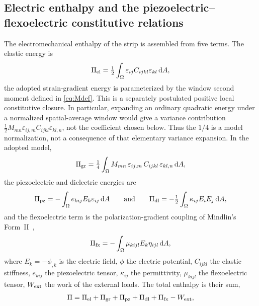 \FloatBarrier
\subsection{Electric enthalpy and the piezoelectric--flexoelectric
constitutive relations}
\label{sec:energy}

The electromechanical enthalpy of the strip is assembled from five terms. The
elastic energy is
\begin{equation}
  \Pi_{\rm el} = \tfrac12\int_\Omega \varepsilon_{ij} C_{ijkl}
        \varepsilon_{kl}\,\mathrm{d}A ,
  \label{eq:Eel}
\end{equation}
the adopted strain-gradient energy is parameterized by the window second
moment defined in \eqref{eq:Mdef}. This is a separately postulated positive
local constitutive closure. In particular, expanding an ordinary quadratic
energy under a normalized spatial-average window would give a variance
contribution $\tfrac12 M_{mn}\varepsilon_{ij,m}C_{ijkl}\varepsilon_{kl,n}$,
not the coefficient chosen below. Thus the $1/4$ is a model normalization,
not a consequence of that elementary variance expansion. In the adopted model,
\begin{equation}
  \Pi_{\rm gr} = \tfrac14\int_\Omega M_{mn}\,
        \varepsilon_{ij,m}\,C_{ijkl}\,\varepsilon_{kl,n}\,\mathrm{d}A ,
  \label{eq:Egrad}
\end{equation}
the piezoelectric and dielectric energies are
\begin{equation}
  \Pi_{\rm pz} = -\int_\Omega e_{kij} E_k \varepsilon_{ij}\,\mathrm{d}A
  \qquad\text{and}\qquad
  \Pi_{\rm dl} = -\tfrac12\int_\Omega \kappa_{ij} E_i E_j\,\mathrm{d}A ,
  \label{eq:Epiezo}
\end{equation}
and the flexoelectric term is the polarization-gradient coupling of Mindlin's
Form~II~\cite{Mindlin1965,Toupin1962,Mindlin1968},
\begin{equation}
  \Pi_{\rm fx} = -\int_\Omega \mu_{kijl} E_k \eta_{ijl}\,\mathrm{d}A ,
  \label{eq:Eflexo}
\end{equation}
where $E_k=-\phi_{,k}$ is the electric field, $\phi$ the electric potential,
$C_{ijkl}$ the elastic stiffness, $e_{kij}$ the piezoelectric tensor,
$\kappa_{ij}$ the permittivity, $\mu_{kijl}$ the flexoelectric tensor,
$W_{\rm ext}$ the work of the external loads. The total enthalpy is their sum,
\begin{equation}
  \Pi = \Pi_{\rm el} + \Pi_{\rm gr} + \Pi_{\rm pz} + \Pi_{\rm dl}
        + \Pi_{\rm fx} - W_{\rm ext},
  \label{eq:energy}
\end{equation}
